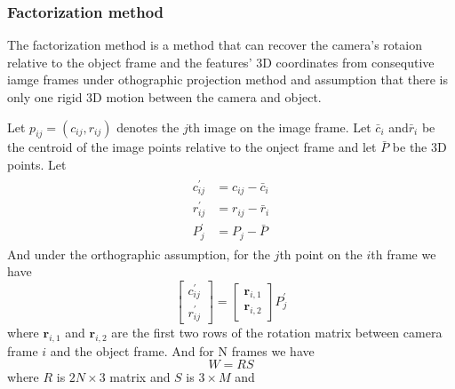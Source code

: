 \documentclass{article}
\begin{document}
\subsubsection*{Factorization method}
\par
The factorization method is a method that can recover the camera's rotaion relative to the object frame and the features' 3D coordinates from consequtive iamge frames under othographic projection method and assumption that there is only one rigid 3D motion between the camera and object.
\par
Let $p_{ij}=(c_{ij},r_{ij})$ denotes the $j$th image on the image frame. Let $\bar{c}_i$ and$\bar{r}_i$ be the centroid of the image points relative to the onject frame and let $\bar{P}$ be the 3D points. Let
\begin{align}
\begin{split}
c_{ij}^{'} &= c_{ij}-\bar{c}_i\\
r_{ij}^{'} &= r_{ij}-\bar{r}_i\\
P_j^{'} &= P_j-\bar{P}
\end{split}
\end{align}
And under the orthographic assumption, for the $j$th point on the $i$th frame we have
\begin{equation}
\begin{bmatrix}c_{ij}^{'}\\r_{ij}^{'}\end{bmatrix}=\begin{bmatrix}\boldsymbol{r}_{i,1}\\\boldsymbol{r}_{i,2}\end{bmatrix}P_j^{'}
\end{equation} 
where $\boldsymbol{r}_{i,1}$ and $\boldsymbol{r}_{i,2}$ are the first two rows of the rotation matrix between camera frame $i$ and the object frame. And for N frames we have
\begin{equation}
W = RS
\end{equation}
where $R$ is $2N\times3$ matrix and $S$ is $3\times M$ and 
\end{document}
